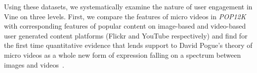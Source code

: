 %



Using these datasets, we systematically examine the nature of user engagement in Vine on three levels. First, we compare the features of micro videos in \emph{POP12K} with corresponding features of popular content on image-based and video-based user generated content platforms (Flickr and YouTube respectively) and find for the first time quantitative evidence that lends support to David Pogue's theory of micro videos as a whole new form of expression falling on a spectrum between images and videos~\cite{pogue13}. 

